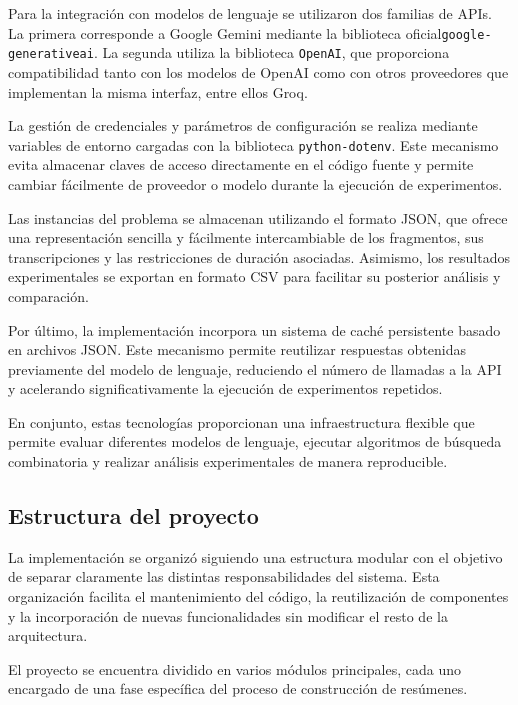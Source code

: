 \documentclass[12pt,a4paper]{article}
\begin{document}
Para la integración con modelos de lenguaje se utilizaron dos familias de APIs. La primera corresponde a Google Gemini mediante la biblioteca oficial\linebreak \texttt{google-generativeai}. La segunda utiliza la biblioteca \texttt{OpenAI}, que proporciona compatibilidad tanto con los modelos de OpenAI como con otros proveedores que implementan la misma interfaz, entre ellos Groq.

La gestión de credenciales y parámetros de configuración se realiza mediante variables de entorno cargadas con la biblioteca \texttt{python-dotenv}. Este mecanismo evita almacenar claves de acceso directamente en el código fuente y permite cambiar fácilmente de proveedor o modelo durante la ejecución de experimentos.

Las instancias del problema se almacenan utilizando el formato JSON, que ofrece una representación sencilla y fácilmente intercambiable de los fragmentos, sus transcripciones y las restricciones de duración asociadas. Asimismo, los resultados experimentales se exportan en formato CSV para facilitar su posterior análisis y comparación.

Por último, la implementación incorpora un sistema de caché persistente basado en archivos JSON. Este mecanismo permite reutilizar respuestas obtenidas previamente del modelo de lenguaje, reduciendo el número de llamadas a la API y acelerando significativamente la ejecución de experimentos repetidos.

En conjunto, estas tecnologías proporcionan una infraestructura flexible que permite evaluar diferentes modelos de lenguaje, ejecutar algoritmos de búsqueda combinatoria y realizar análisis experimentales de manera reproducible.


\subsection{Estructura del proyecto}

La implementación se organizó siguiendo una estructura modular con el objetivo de separar claramente las distintas responsabilidades del sistema. Esta organización facilita el mantenimiento del código, la reutilización de componentes y la incorporación de nuevas funcionalidades sin modificar el resto de la arquitectura.

El proyecto se encuentra dividido en varios módulos principales, cada uno encargado de una fase específica del proceso de construcción de resúmenes.
\end{document}
